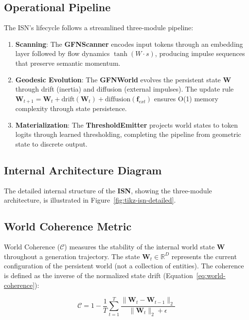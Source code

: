 \documentclass[12pt,a4paper]{article}
\begin{document}
\subsection{Operational Pipeline}

The ISN's lifecycle follows a streamlined three-module pipeline:

\begin{enumerate}
    \item \textbf{Scanning}: The \textbf{GFNScanner} encodes input tokens through an embedding layer followed by flow dynamics $\tanh(W \cdot s)$, producing impulse sequences that preserve semantic momentum.

    \item \textbf{Geodesic Evolution}: The \textbf{GFNWorld} evolves the persistent state $\mathbf{W}$ through drift (inertia) and diffusion (external impulses). The update rule $\mathbf{W}_{t+1} = \mathbf{W}_t + \text{drift}(\mathbf{W}_t) + \text{diffusion}(\mathbf{f}_{ext})$ ensures O(1) memory complexity through state persistence.

    \item \textbf{Materialization}: The \textbf{ThresholdEmitter} projects world states to token logits through learned thresholding, completing the pipeline from geometric state to discrete output.
\end{enumerate}

\subsection{Internal Architecture Diagram}

The detailed internal structure of the \textbf{ISN}, showing the three-module architecture, is illustrated in Figure~\ref{fig:tikz-isn-detailed}.

\subsection{World Coherence Metric}

World Coherence ($\mathcal{C}$) measures the stability of the internal world state $\mathbf{W}$ throughout a generation trajectory. The state $\mathbf{W}_t \in \mathbb{R}^D$ represents the current configuration of the persistent world (not a collection of entities). The coherence is defined as the inverse of the normalized state drift (Equation~\ref{eq:world-coherence}):

\begin{equation}
    \mathcal{C} = 1 - \frac{1}{T} \sum_{t=1}^{T} \frac{\|\mathbf{W}_t - \mathbf{W}_{t-1}\|_2}{\|\mathbf{W}_t\|_2 + \epsilon}
    \label{eq:world-coherence}
\end{equation}
\end{document}
